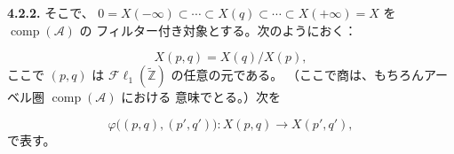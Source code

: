 \noindent\textbf{4.2.2.}\quad
そこで、
$0=X(-\infty)\subset\cdots\subset X(q)\subset\cdots\subset
X(+\infty)=X$ を $\operatorname{comp}(\mathcal A)$ の
フィルター付き対象とする。次のようにおく：

\begin{equation}
X(p,q)=X(q)/X(p),
\tag{4.2.2.1}
\end{equation}
ここで $(p,q)$ は $\mathcal{F}\ell_1(\widetilde{\mathbb Z})$ の任意の元である。
（ここで商は、もちろんアーベル圏 $\operatorname{comp}(\mathcal A)$ における
意味でとる。）次を

\begin{equation}
\varphi\bigl((p,q),(p',q')\bigr)\colon
X(p,q)\longrightarrow X(p',q'),
\tag{4.2.2.2}
\end{equation}
で表す。
\endgroup
